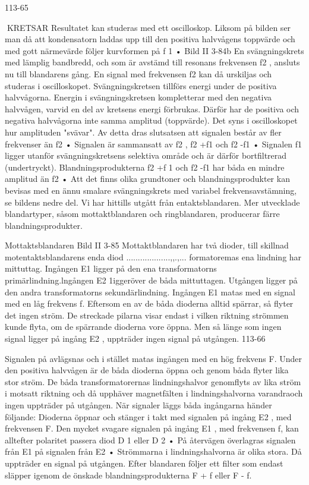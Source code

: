 \documentclass[a4paper,twoside,twocolumn,openright]{book}
\begin{document}
{{{{113-65

KRETSAR
Resultatet kan studeras med ett oscilloskop. Liksom på bilden ser man då att kondensatorn laddas upp till den positiva halvvågens toppvärde och med gott närmevärde
följer kurvformen på f 1 •
Bild II 3-84b
En svängningskrets med lämplig bandbredd, och som är avstämd till resonans
frekvensen f2 , ansluts nu till blandarens
gång. En signal med frekvensen f2 kan då
urskiljas och studeras i oscilloskopet. Svängningskretsen tillförs energi under de positiva
halvvågorna. Energin i svängningskretsen
kompletterar med den negativa halvvågen,
varvid en del av kretsens energi förbrukas.
Därför har de positiva och negativa halvvågorna inte samma amplitud (toppvärde).
Det syns i oscilloskopet hur amplituden
"svävar". Av detta dras slutsatsen att signalen består av fler frekvenser än f2 • Signalen
är sammansatt av f2 , f2 +f1 och f2 -f1 • Signalen
f1 ligger utanför svängningskretsens selektiva område och är därför bortfiltrerad (undertryckt). Blandningsprodukterna f2 +f 1 och f2 -f1
har båda en mindre amplitud än f2 •
Att det finns olika grundtoner och blandningsprodukter kan bevisas med en ännu
smalare svängningskrets med variabel frekvensavstämning, se bildens nedre del.
Vi har hittills utgått från entaktsblandaren.
Mer utvecklade blandartyper, såsom mottaktblandaren och ringblandaren, producerar färre blandningsprodukter.

Mottaktsblandaren
Bild II 3-85
Mottaktblandaren har två dioder, till skillnad
motentaktsblandarens enda diod ...................,,.,...
formatoremas ena lindning har mittuttag.
Ingången E1 ligger på den ena transformatorns primärlindning.lngången E2 1iggeröver
de båda mittuttagen. Utgången ligger på den
andra transformatorns sekundärlindning.
Ingången E1 matas med en signal med
en låg frekvens f. Eftersom en av de båda
dioderna alltid spärrar, så flyter det ingen
ström. De streckade pilarna visar endast i
vilken riktning strömmen kunde flyta, om de
spärrande dioderna vore öppna. Men så
länge som ingen signal ligger på ingång E2 ,
uppträder ingen signal på utgången.
113-66

Signalen på
avlägsnas och i stället
matas ingången
med en hög frekvens F.
Under den positiva halvvågen är de båda
dioderna öppna och genom båda flyter lika
stor ström. De båda transformatorernas
lindningshalvor genomflyts av lika ström i
motsatt riktning och då upphäver magnetfälten i lindningshalvorna varandraoch ingen
uppträder på utgången.
När signaler läggs
båda ingångarna
händer följande:
Dioderna öppnar och stänger i takt med
signalen på ingång E2 , med frekvensen F.
Den mycket svagare signalen på ingång E1 ,
med frekvensen f, kan alltefter polaritet passera diod D 1 eller D 2 • På återvägen överlagras signalen från E1 på signalen från E2 •
Strömmarna i lindningshalvorna är olika
stora. Då uppträder en signal på utgången.
Efter blandaren följer ett filter som endast
släpper igenom de önskade blandningsprodukterna F + f eller F - f.

}}}}
\end{document}
